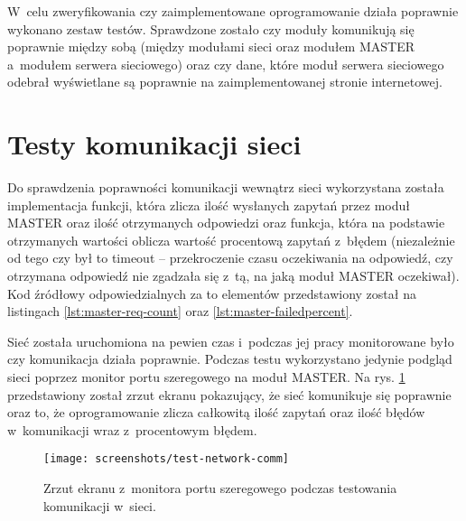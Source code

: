 W~celu zweryfikowania czy zaimplementowane oprogramowanie działa poprawnie wykonano zestaw testów. Sprawdzone zostało
czy moduły komunikują się poprawnie między sobą (między modułami sieci oraz modułem MASTER a~modułem serwera sieciowego)
oraz czy dane, które moduł serwera sieciowego odebrał wyświetlane są poprawnie na zaimplementowanej stronie
internetowej.

\section{\label{sect:test-network-comm}Testy komunikacji sieci} Do sprawdzenia poprawności komunikacji wewnątrz sieci
wykorzystana została implementacja funkcji, która zlicza ilość wysłanych zapytań przez moduł MASTER oraz ilość
otrzymanych odpowiedzi oraz funkcja, która na podstawie otrzymanych wartości oblicza wartość procentową zapytań z~błędem
(niezależnie od tego czy był to timeout -- przekroczenie czasu oczekiwania na odpowiedź, czy otrzymana odpowiedź nie
zgadzała się z~tą, na jaką moduł MASTER oczekiwał). Kod źródłowy odpowiedzialnych za to elementów przedstawiony został
na listingach \ref{lst:master-req-count} oraz \ref{lst:master-failedpercent}.





Sieć została uruchomiona na pewien czas i~podczas jej pracy monitorowane było czy komunikacja działa poprawnie. Podczas
testu wykorzystano jedynie podgląd sieci poprzez monitor portu szeregowego na moduł MASTER. Na rys.
\ref{img:test-network-comm} przedstawiony został zrzut ekranu pokazujący, że sieć komunikuje się poprawnie oraz to, że
oprogramowanie zlicza całkowitą ilość zapytań oraz ilość błędów w~komunikacji wraz z~procentowym błędem.

\begin{figure}[!htbp]
    \centering
    \texttt{[image: screenshots/test-network-comm]}
    \caption{\label{img:test-network-comm}Zrzut ekranu z~monitora portu szeregowego podczas testowania komunikacji
        w~sieci.}
\end{figure}

